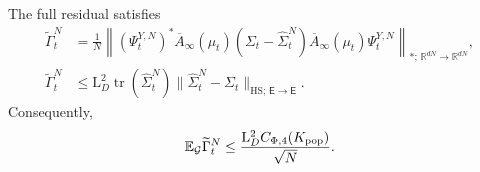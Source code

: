\begin{lemma}
\label{lem:tilde-gamma-weighted-representation}
The full residual satisfies
\begin{align}
 \widetilde\Gamma_t^N
 &=\frac1N\left\|(\Psi_t^{Y,N})^*\overline A_\infty(\mu_t)
       (\Sigma_t-\widehat\Sigma_t^N)
       \overline A_\infty(\mu_t)\Psi_t^{Y,N}\right\|_{*;\,\mathbb R^{dN}\to\mathbb R^{dN}},
 \label{eq:tilde-gamma-weighted-matrix-identity}\\
 \widetilde\Gamma_t^N
 &\le\mathrm L_D^2\operatorname{tr}(\widehat\Sigma_t^N)
                  \|\widehat\Sigma_t^N-\Sigma_t\|_{\mathrm{HS};\,\mathsf E\to\mathsf E}.
 \label{eq:tilde-gamma-deterministic-reduction}
\end{align}
Consequently,
\begin{equation}
\label{eq:tilde-gamma-full-expectation-bound}
 \mathbb E_{\mathcal G}\widetilde\Gamma_t^N
 \le\frac{\mathrm L_D^2 C_{\Phi,4}(K_{\rm pop})}{\sqrt N}.
\end{equation}
\end{lemma}
